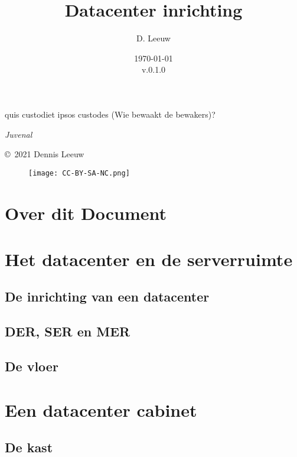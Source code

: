 \documentclass[a4paper,12pt,twoside,openright,titlepage]{book}
\author{D. Leeuw}
\title{Datacenter inrichting}
\date{\today\\v.0.1.0}
\begin{document}

\maketitle

\epigraph{quis custodiet ipsos custodes (Wie bewaakt de bewakers)?}{\textit{Juvenal}}

\newpage

\copyright\ 2021 Dennis Leeuw\\

\begin{figure}[H]
\texttt{[image: CC-BY-SA-NC.png]}
\end{figure}

\bigskip




\frontmatter
\chapter{Over dit Document}



\tableofcontents

\mainmatter

\chapter{Het datacenter en de serverruimte}

\section{De inrichting van een datacenter}

\section{DER, SER en MER}

\section{De vloer}


\chapter{Een datacenter cabinet}

\section{De kast}

\end{document}
